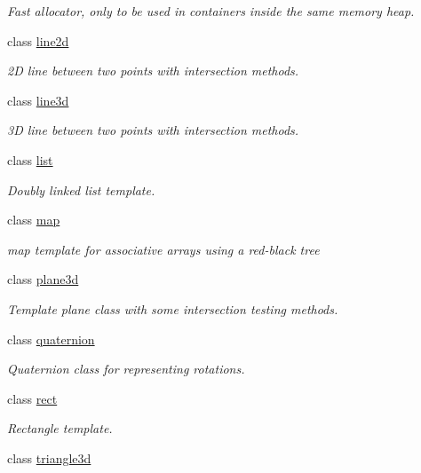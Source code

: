 \begin{DoxyCompactItemize}
\begin{DoxyCompactList}\small\item\em Fast allocator, only to be used in containers inside the same memory heap. \end{DoxyCompactList}\item 
class \hyperlink{classirr_1_1core_1_1line2d}{line2d}
\begin{DoxyCompactList}\small\item\em 2D line between two points with intersection methods. \end{DoxyCompactList}\item 
class \hyperlink{classirr_1_1core_1_1line3d}{line3d}
\begin{DoxyCompactList}\small\item\em 3D line between two points with intersection methods. \end{DoxyCompactList}\item 
class \hyperlink{classirr_1_1core_1_1list}{list}
\begin{DoxyCompactList}\small\item\em Doubly linked list template. \end{DoxyCompactList}\item 
class \hyperlink{classirr_1_1core_1_1map}{map}
\begin{DoxyCompactList}\small\item\em map template for associative arrays using a red-\/black tree \end{DoxyCompactList}\item 
class \hyperlink{classirr_1_1core_1_1plane3d}{plane3d}
\begin{DoxyCompactList}\small\item\em Template plane class with some intersection testing methods. \end{DoxyCompactList}\item 
class \hyperlink{classirr_1_1core_1_1quaternion}{quaternion}
\begin{DoxyCompactList}\small\item\em Quaternion class for representing rotations. \end{DoxyCompactList}\item 
class \hyperlink{classirr_1_1core_1_1rect}{rect}
\begin{DoxyCompactList}\small\item\em Rectangle template. \end{DoxyCompactList}\item 
class \hyperlink{classirr_1_1core_1_1triangle3d}{triangle3d}

\end{DoxyCompactItemize}
